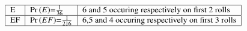 \begin{align}
    \begin{tabular}{|l|l|l|}\hline
        E	    &\pr{E}=$\frac{1}{36}$  &6 and 5 occuring respectively on first 2 rolls\\\hline
        EF	&\pr{EF}=$\frac{1}{216}$ &6,5 and 4 occuring respectively on first 3 rolls\\\hline
        \end{tabular}
    \end{align}
